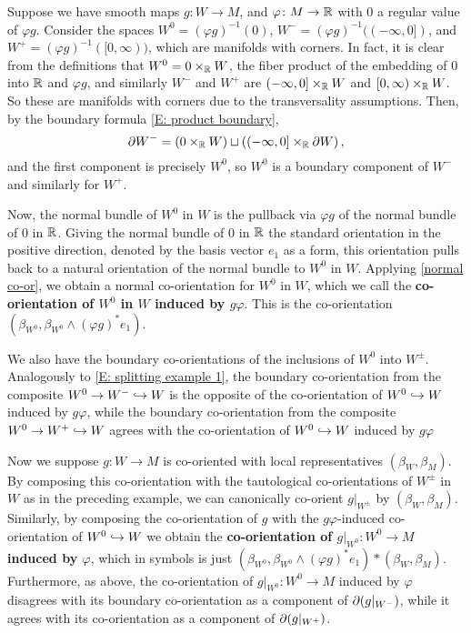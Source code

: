 \begin{example}\label{E: manifold decomposition}
	Suppose we have smooth maps $g \colon W \to M$, and $\varphi \colon M \to \mathbb{R}$ with $0$ a regular value of $\varphi g$.
	Consider the spaces $W^0 = (\varphi g)^{-1}(0)$, $W^- = (\varphi g)^{-1}((-\infty,0])$, and $W^+ = (\varphi g)^{-1}([0,\infty))$, which are manifolds with corners.
	In fact, it is clear from the definitions that $W^0 = 0 \times_{\mathbb{R}} W$, the fiber product of the embedding of $0$ into $\mathbb{R}$ and $\varphi g$, and similarly $W^-$ and $W^+$ are $(-\infty,0] \times_{\mathbb{R}} W$ and $[0,\infty) \times_{\mathbb{R}} W$. So these are manifolds with corners due to the transversality assumptions. Then, by the boundary formula \cref{E: product boundary}, $$\partial W^-= \left(0 \times_{\mathbb{R}} W\right) \sqcup \left((-\infty,0] \times_{\mathbb{R}} \partial W\right),$$
	and the first component is precisely $W^0$, so $W^0$ is a boundary component of $W^-$ and similarly for $W^+$.  


	Now, the normal bundle of $W^0$ in $W$ is the pullback via $\varphi g$ of the normal bundle of $0$ in $\mathbb{R}$. Giving the normal bundle of $0$ in $\mathbb{R}$ the standard orientation in the positive direction, denoted by the basis vector $e_1$ as a form, this orientation pulls back to a natural orientation of the normal bundle to $W^0$ in $W$. Applying \cref{normal co-or}, we obtain a normal co-orientation for $W^0$ in $W$, which we call the \textbf{co-orientation of $W^0$ in $W$ induced by $g\varphi$}. This is the co-orientation $(\beta_{W^0}, \beta_{W^0} \wedge (\varphi g)^*e_1)$.



	We also have the boundary co-orientations of the inclusions of $W^0$ into $W^{\pm}$.
	Analogously to \cref{E: splitting example 1}, the boundary co-orientation from the composite $W^0 \to W^- \hookrightarrow W$  is the opposite of the co-orientation of $W^0\hookrightarrow W$ induced by $g\varphi$, while the boundary co-orientation from the composite $W^0 \to W^+ \hookrightarrow W$  agrees with the co-orientation of $W^0\hookrightarrow W$ induced by $g\varphi$

	Now we suppose $g \colon W \to M$ is co-oriented with local representatives $(\beta_W, \beta_M)$.
	By composing this co-orientation with the tautological co-orientations of $W^\pm$ in $W$ as in the preceding example, we can canonically co-orient $g|_{W^\pm}$ by $(\beta_W, \beta_M)$.
	Similarly, by composing the co-orientation of $g$ with the $g\varphi$-induced co-orientation of $W^0 \hookrightarrow W$ we obtain the \textbf{co-orientation of $g|_{W^0} \colon W^0 \to M$ induced by $\varphi$}, which in symbols is just $(\beta_{W^0}, \beta_{W^0} \wedge (\varphi g)^*e_1)*(\beta_W,\beta_M)$.
	Furthermore, as above, the co-orientation of $g|_{W^0} \colon W^0 \to M$ induced by $\varphi$ disagrees with its boundary co-orientation as a component of $\partial(g|_{W^-})$, while it agrees with its co-orientation as a component of $\partial(g|_{W^+})$.


\end{example}
